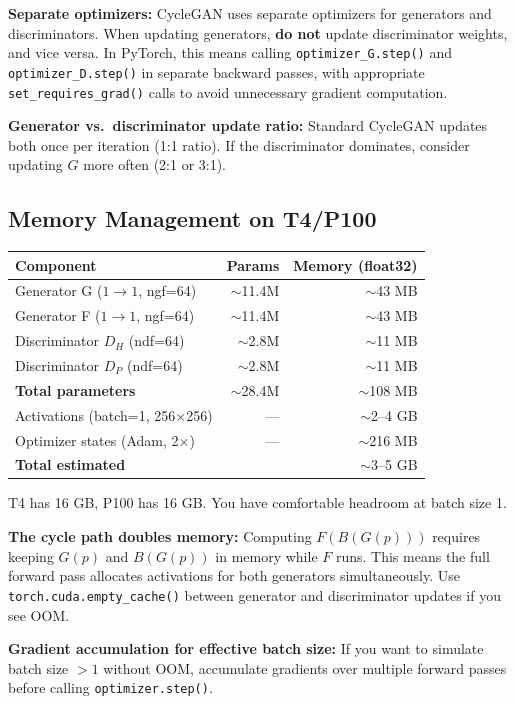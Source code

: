 \documentclass[11pt,a4paper]{article}
\theoremstyle{definition}
\begin{document}
\begin{edgecase}
\textbf{Separate optimizers:} CycleGAN uses separate optimizers for generators and discriminators. When updating generators, \textbf{do not} update discriminator weights, and vice versa. In PyTorch, this means calling \texttt{optimizer\_G.step()} and \texttt{optimizer\_D.step()} in separate backward passes, with appropriate \texttt{set\_requires\_grad()} calls to avoid unnecessary gradient computation.

\vspace{0.3em}
\textbf{Generator vs.\ discriminator update ratio:} Standard CycleGAN updates both once per iteration (1:1 ratio). If the discriminator dominates, consider updating $G$ more often (2:1 or 3:1).
\end{edgecase}

\subsection{Memory Management on T4/P100}

\begin{center}
\begin{tabular}{lrr}
\toprule
Component & Params & Memory (float32) \\
\midrule
Generator G ($1 \to 1$, ngf=64) & $\sim$11.4M & $\sim$43 MB \\
Generator F ($1 \to 1$, ngf=64) & $\sim$11.4M & $\sim$43 MB \\
Discriminator $D_H$ (ndf=64) & $\sim$2.8M & $\sim$11 MB \\
Discriminator $D_P$ (ndf=64) & $\sim$2.8M & $\sim$11 MB \\
\midrule
\textbf{Total parameters} & $\sim$28.4M & $\sim$108 MB \\
\midrule
Activations (batch=1, 256$\times$256) & --- & $\sim$2--4 GB \\
Optimizer states (Adam, 2$\times$) & --- & $\sim$216 MB \\
\midrule
\textbf{Total estimated} & & $\sim$3--5 GB \\
\bottomrule
\end{tabular}
\end{center}

T4 has 16 GB, P100 has 16 GB. You have comfortable headroom at batch size 1.

\begin{edgecase}
\textbf{The cycle path doubles memory:} Computing $F(B(G(p)))$ requires keeping $G(p)$ and $B(G(p))$ in memory while $F$ runs. This means the full forward pass allocates activations for both generators simultaneously. Use \texttt{torch.cuda.empty\_cache()} between generator and discriminator updates if you see OOM.

\vspace{0.3em}
\textbf{Gradient accumulation for effective batch size:} If you want to simulate batch size $>1$ without OOM, accumulate gradients over multiple forward passes before calling \texttt{optimizer.step()}.
\end{edgecase}
\end{document}
